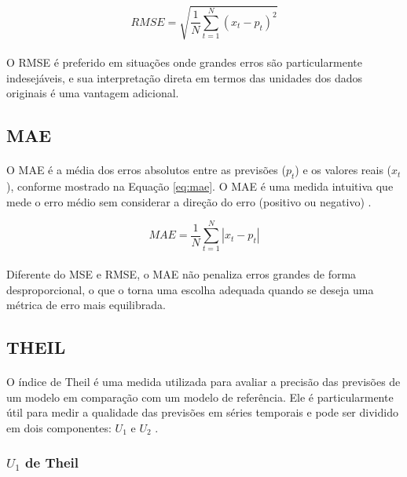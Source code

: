 \begin{equation}
	RMSE = \sqrt{\frac{1}{N} \sum_{t=1}^{N} (x_t - p_t)^2}
	\label{eq:rmse}
\end{equation}
\paragraph{} O \ac{RMSE} é preferido em situações onde grandes erros são particularmente indesejáveis, e sua interpretação direta em termos das unidades dos dados originais é uma vantagem adicional.

\subsection{\acf{MAE}}
\paragraph{} O \ac{MAE} é a média dos erros absolutos entre as previsões ($p_t$) e os valores reais ($x_t$), conforme mostrado na Equação \ref{eq:mae}. O \ac{MAE} é uma medida intuitiva que mede o erro médio sem considerar a direção do erro (positivo ou negativo) \cite{datahackers_regressao}.

\begin{equation}
	MAE = \frac{1}{N} \sum_{t=1}^{N} \left|x_t - p_t\right|
	\label{eq:mae}
\end{equation}
\paragraph{} Diferente do \ac{MSE} e \ac{RMSE}, o \ac{MAE} não penaliza erros grandes de forma desproporcional, o que o torna uma escolha adequada quando se deseja uma métrica de erro mais equilibrada.

\subsection{\acf{THEIL}}
\paragraph{} O índice de Theil é uma medida utilizada para avaliar a precisão das previsões de um modelo em comparação com um modelo de referência. Ele é particularmente útil para medir a qualidade das previsões em séries temporais e pode ser dividido em dois componentes: \(U_1\) e \(U_2\) \cite{theil_forecast}.

\subsubsection{\(U_1\) de Theil}
